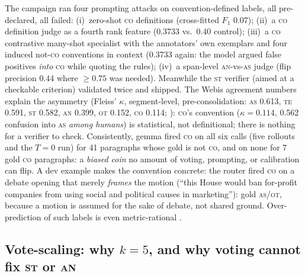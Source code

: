 \documentclass[11pt]{article}
\newcommand{\lab}[1]{\textsc{#1}}
\newcommand{\co}{\lab{co}}
\newcommand{\as}{\lab{as}}
\newcommand{\te}{\lab{te}}
\newcommand{\st}{\lab{st}}
\newcommand{\an}{\lab{an}}
\newcommand{\ot}{\lab{ot}}
\begin{document}
The campaign ran four prompting attacks on convention-defined labels, all
pre-declared, all failed: (i)~zero-shot \co{} definitions
(cross-fitted $F_1$ 0.07); (ii)~a \co{} definition judge as a fourth rank
feature (0.3733 vs.\ 0.40 control); (iii)~a \co{} contrastive many-shot
specialist with the annotators' own exemplars and four induced
not-\co{} conventions in context (0.3733
again: the model argued false positives \emph{into} \co{} while quoting
the rules); (iv)~a span-level \an-vs-\as{} judge (flip precision 0.44
where ${\geq}0.75$ was needed). Meanwhile the
\st{} verifier (aimed at a checkable
criterion) validated twice and shipped. The Webis agreement numbers
explain the asymmetry (Fleiss' $\kappa$, segment-level,
pre-consolidation: \as{} 0.613, \te{} 0.591, \st{} 0.582, \an{} 0.399,
\ot{} 0.152, \co{} 0.114; \citealp{alkhatib-etal-2016-news}): \co's
convention ($\kappa{=}0.114$, 0.562 confusion into \as{} \emph{among
humans}) is statistical, not definitional; there is nothing for a
verifier to check. Consistently,
gemma fired \co{} on all six calls (five rollouts and the $T{=}0$ run)
for 41 paragraphs whose gold is not \co, and on none for 7 gold \co{}
paragraphs:
a \emph{biased coin} no amount of
voting, prompting, or calibration can flip. A dev example makes the
convention concrete: the router fired \co{} on a debate opening that
merely \emph{frames} the motion (``this House would ban for-profit
companies from using social and political causes in marketing''): gold
\as{}/\ot, because a motion is assumed for the sake of debate, not
shared ground. Over-prediction of such
labels is even metric-rational \citep{lipton-etal-2014-thresholding}.

\subsection{Vote-scaling: why $k{=}5$, and why voting cannot fix \st{} or \an}
\label{sec:votes}
\end{document}
